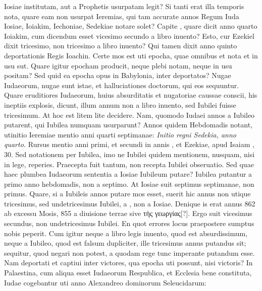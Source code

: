  Iosiae institutam, aut a
Prophetis usurpatam legit?
Si tanti erat illa temporis nota, quare
eam non usurpat Ieremias, qui tam accurate annos Regum Iuda Iosiae,
Ioiakim, Iechoniae, Sedekiae notare solet?
Capite , quare dicit
anno quarto Ioiakim, cum dicendum esset vicesimo secundo a libro
inuento?
Esto, cur Ezekiel dixit tricesimo, non tricesimo a libro inuento?
Qui tamen dixit anno quinto deportationis Regis Ioachin.
%
Certe mos est uti epocha, quae omnibus et nota et in usu sut.
Quare
igitur epocham producit, neque plebi notam, neque in usu positam?
Sed quid ea epocha opus in Babylonia, inter deportatos?
Nugae Iudaeorum,
nugae sunt istae, et halluciationes doctorum, qui eos sequuntur.
Quare eruditiores Iudaeorum, huius absurditatis et nugatoriae
caussae conscii, his ineptiis explosis, dicunt, illum annum non a
libro inuento, sed Iubilei fuisse tricesimum.
At hoc est litem lite decidere.
Nam, quomodo Iudaei annos a Iubileo putarent, qui Iubilea
numquam usurparunt?
Annos quidem Hebdomadis notant, utinitio
 Ieremiae mentio anni quarti septimanae: \textit{Initio regni
Sedekia, anno quarto.}
Rursus mentio anni primi, et secundi in annis
, et  Ezekiae, apud Isaiam , 30.
Sed notationem
per Iubilea, imo ne Iubilei quidem mentionem, nusquam, nisi
in lege, reperies.
Praecepta fuit tantum, non recepta Iubilei obseruatio.
Sed quae haec plumbea Iudaeorum sententia a  Iosiae
Iubileum putare?
Iubilea putantur a primo anno hebdomadis, non
a septimo.
At  Iosiae suit septimus septimanae, non primus.
Quare, si a Iubileis annos putare mos esset, suerit hic annus non utique
tricesimus, sed undetricesimus Iubilei, a , non a
 Iosiae.
Denique is erat annus 862 ab excessu Mosis, 855 a
diuisione terrae sive \textgreek{τὴς γεωργίας[?]}.
Ergo suit vicesimus secundus, non
undetricesimus Iubilei.
En quot errores locus praepostere sumptus
nobis peperit.
Cum igitur neque a libro legis inuento, quod est absurdissimum,
neque a Iubileo, quod est falsum dupliciter, ille tricesimus
annus putandus sit; sequitur, quod negari non potest, a
quodam rege tunc imperante putandum esse.
Nam deportati et captiui
inter victores, qua epocha uti possunt, nisi victoris?
In Palaestina,
cum aliqua esset Iudaeorum Respublica, et Ecclesia bene constituta,
Iudae cogebantur uti anno Alexandreo dominorum Seleucidarum:
